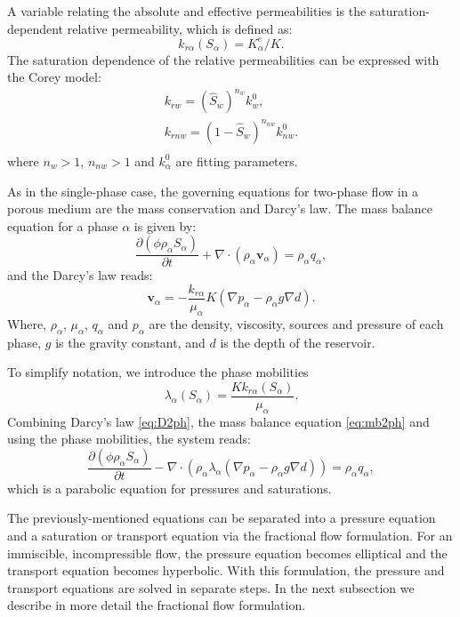 \documentclass[12pt]{article}
\begin{document}
A variable relating the absolute and effective permeabilities is the saturation-dependent relative permeability, which 
is defined as:
$$k_{r\alpha}(S_{\alpha})=K_{\alpha}^e/K.$$
The saturation dependence of the relative permeabilities can be expressed with the Corey model:
\begin{equation}\label{eq:Corey}
\begin{aligned}
k_{rw}=(\hat{S}_w)^{n_w}k_w^0,\\
k_{rnw}=(1-\hat{S}_w)^{n_{nw}}k_{nw}^0.\\
\end{aligned}
\end{equation}
where $n_w>1$, $n_{nw}>1$ and $k_{\alpha}^0$ are fitting parameters.\par
As in the single-phase case, the governing equations for two-phase flow in a porous medium are the mass conservation and 
Darcy's law. 
The mass balance equation for a phase $\alpha$ is given by:
\begin{equation}\label{eq:mb2ph}
 \frac{\partial(\phi \rho_{\alpha}S_{\alpha})}{\partial t}+\nabla \cdot ( \rho_{\alpha} \mathbf{v}_{\alpha})=\rho_{\alpha} q_{\alpha},
\end{equation}
and the Darcy's law reads:
\begin{equation}\label{eq:D2ph}
\mathbf{v}_{\alpha}=-\frac{k_{r\alpha}}{\mu_{\alpha}} {K}(\nabla p_{\alpha}-\rho_{\alpha} g \nabla d).
\end{equation}
Where, $\rho_{\alpha}$, $\mu_{\alpha}$, $q_{\alpha}$ and $p_{\alpha}$ are the density, viscosity, sources and pressure of each 
phase, $g$ is the gravity constant, and $d$ is the depth of the reservoir.   \par
To simplify notation, we introduce the phase mobilities 
\begin{equation}\label{eq:phm}
 \lambda_{\alpha}(S_{\alpha})=\frac{Kk_{r\alpha}(S_{\alpha})}{\mu_{\alpha}}.
\end{equation}
Combining Darcy's law \eqref{eq:D2ph}, the mass balance equation \eqref{eq:mb2ph} and using the phase mobilities, the system reads:
\begin{equation}\label{eq:2ph}
 \frac{\partial(\phi \rho_{\alpha}S_{\alpha})}{\partial t}-\nabla \cdot ( \rho_{\alpha} \lambda_{\alpha}(\nabla p_{\alpha}-\rho_{\alpha} g \nabla d))=\rho_{\alpha} q_{\alpha},
\end{equation}
which is a parabolic equation for pressures and saturations. \par 
The previously-mentioned equations can be separated into a pressure equation and a saturation or transport equation via the 
fractional flow formulation. For an immiscible, incompressible flow, the pressure equation becomes elliptical and the transport 
equation becomes hyperbolic. With this formulation, the pressure and transport equations are solved in separate steps. 
In the next subsection we describe in more detail the fractional flow formulation.
\end{document}
